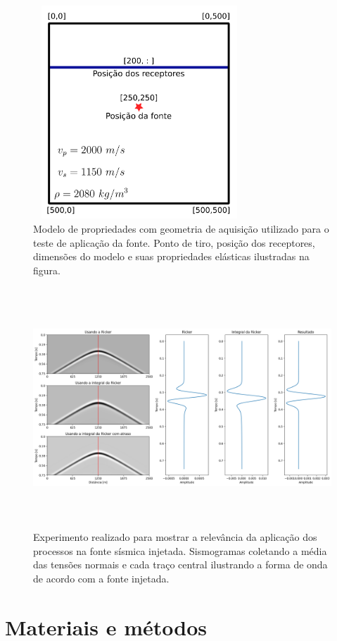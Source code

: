 \documentclass[
	12pt,				%
	openright,			%
	oneside,			%
	a4paper,			%
	english,			%
	brazil				%
	]{abntex2}
\begin{document}
	\begin{figure}[htp!]
		\centering
		\includegraphics[width=8cm,height=8cm]{../imagens/modeloTeste.png}
		\caption{Modelo de propriedades com geometria de aquisição utilizado para o teste de aplicação da fonte. Ponto de tiro, posição dos receptores, dimensões do modelo e suas propriedades elásticas ilustradas na figura.}
		\label{modeloTeste}
	\end{figure}
%	 	
    \begin{figure}[htp!]
		\centering
		\includegraphics[width=15cm,height=9cm]{../imagens/analiseFontes.png}
		\caption{Experimento realizado para mostrar a relevância da aplicação dos processos na fonte sísmica injetada. Sismogramas coletando a média das tensões normais e cada traço central ilustrando a forma de onda de acordo com a fonte injetada.}
		\label{analiseFontes}
	\end{figure}	  
    
\chapter{Materiais e métodos}
\end{document}
